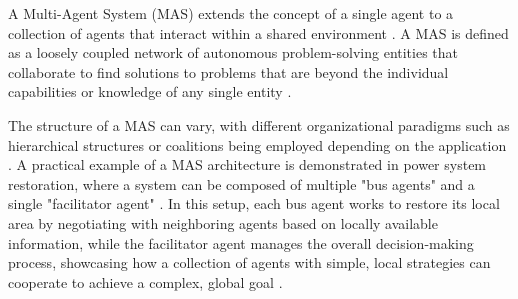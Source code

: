             A Multi-Agent System (MAS) extends the concept of a single agent to a collection of agents that interact within a shared environment \citep{Gokulan2010}. A MAS is defined as a loosely coupled network of autonomous problem-solving entities that collaborate to find solutions to problems that are beyond the individual capabilities or knowledge of any single entity \citep{FloresMendez1999}. 
            
            
            The structure of a MAS can vary, with different organizational paradigms such as hierarchical structures or coalitions being employed depending on the application \citep{Gokulan2010}. A practical example of a MAS architecture is demonstrated in power system restoration, where a system can be composed of multiple "bus agents" and a single "facilitator agent" \citep{Nagata2002}. In this setup, each bus agent works to restore its local area by negotiating with neighboring agents based on locally available information, while the facilitator agent manages the overall decision-making process, showcasing how a collection of agents with simple, local strategies can cooperate to achieve a complex, global goal \citep{Nagata2002}.



